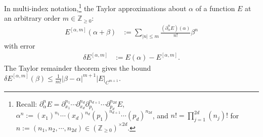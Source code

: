 \documentclass{article}
\numberwithin{equation}{section}
\begin{document}
In multi-index notation,\footnote{Recall: $\partial_\alpha^n E=\partial_{x_1}^{n_1}\cdots\partial_{x_d}^{n_d} \partial_{p_1}^{n_{d+1}}\cdots\partial_{p_d}^{n_{2d}}E$, $\alpha^n := (x_1)^{n_1}\cdots (x_d)^{n_d} (p_1)^{n_{d+1}}\cdots (p_d)^{n_{2d}}$, and 
$n!=\prod_{j=1}^{2d} (n_j)!$ for $n:=(n_1,n_2,\cdots,n_{2d}) \in (\mathbb{Z}_{\ge 0})^{\times 2d}$.} the Taylor approximations about $\alpha$ of a function $E$ at an arbitrary order $m\in\mathbb{Z}_{\ge 0}$:
\begin{align}
	E^{[\alpha,m]}(\alpha+\beta) &:= \sum_{|n|\le m} \frac{
    (\partial_\alpha^n E)(\alpha)
    }{n!} \beta^n
\end{align}
with error
\begin{align}
	\delta E^{[\alpha,m]} &:= E(\alpha)-E^{[\alpha,m]}.
\end{align}
The Taylor remainder theorem gives the bound 
$\delta E^{[\alpha,m]}(\beta) \leq \frac{1}{m!}|\beta-\alpha|^{m+1}|E|_{C^{m+1}}$.
\end{document}
